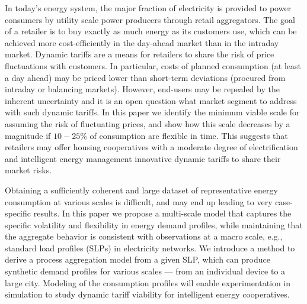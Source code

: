 \documentclass[conference]{IEEEtran}
\begin{document}
In today's energy system, the major fraction of electricity is provided to power consumers by utility scale power producers through retail aggregators. 
The goal of a retailer is to buy exactly as much energy as its customers use, which can be achieved more cost-efficiently in the day-ahead market than in the intraday market. Dynamic tariffs are a means for retailers to share the risk of price fluctuations with customers. In particular, costs of planned consumption (at least a day ahead) may be priced lower than short-term deviations (procured from intraday or balancing markets). However, end-users may be repealed by the inherent uncertainty and it is an open question what market segment to address with such dynamic tariffs. In this paper we identify the minimum viable scale for assuming the risk of fluctuating prices, and show how this scale decreases by a magnitude if $10-25 \%$ of consumption are flexible in time. This suggests that retailers may offer housing cooperatives with a moderate degree of electrification and intelligent energy management innovative dynamic tariffs to share their market risks. %

Obtaining a sufficiently coherent and large dataset of representative energy consumption at various scales is difficult, and may end up leading to very case-specific results. In this paper we propose a multi-scale model that captures the specific volatility and flexibility in energy demand profiles, while maintaining that the aggregate behavior is consistent with observations at a macro scale, e.g., standard load profiles (SLPs) in electricity networks. We introduce a method to derive a process aggregation model from a given SLP, which can produce synthetic demand profiles for various scales --- from an individual device to a large city. Modeling of the consumption profiles will enable experimentation in simulation to study dynamic tariff viability for intelligent energy cooperatives.

\end{document}
